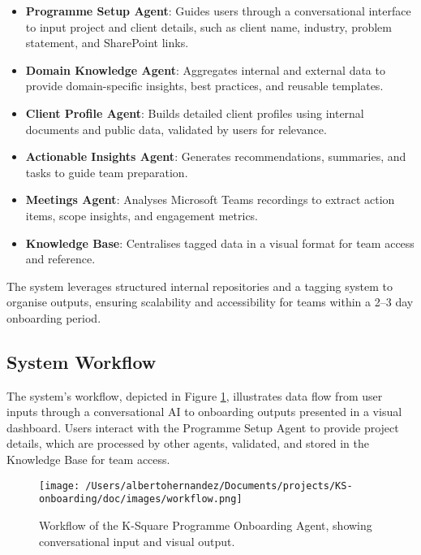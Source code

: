 \documentclass{article}
\begin{document}
\begin{itemize}
    \item \textbf{Programme Setup Agent}: Guides users through a conversational interface to input project and client details, such as client name, industry, problem statement, and SharePoint links.
    \item \textbf{Domain Knowledge Agent}: Aggregates internal and external data to provide domain-specific insights, best practices, and reusable templates.
    \item \textbf{Client Profile Agent}: Builds detailed client profiles using internal documents and public data, validated by users for relevance.
    \item \textbf{Actionable Insights Agent}: Generates recommendations, summaries, and tasks to guide team preparation.
    \item \textbf{Meetings Agent}: Analyses Microsoft Teams recordings to extract action items, scope insights, and engagement metrics.
    \item \textbf{Knowledge Base}: Centralises tagged data in a visual format for team access and reference.
\end{itemize}

The system leverages structured internal repositories and a tagging system to organise outputs, ensuring scalability and accessibility for teams within a 2–3 day onboarding period.

\subsection{System Workflow}
The system’s workflow, depicted in Figure \ref{fig:workflow}, illustrates data flow from user inputs through a conversational AI to onboarding outputs presented in a visual dashboard. Users interact with the Programme Setup Agent to provide project details, which are processed by other agents, validated, and stored in the Knowledge Base for team access.

\begin{landscape}
\begin{figure}[p]
    \centering
    \texttt{[image: /Users/albertohernandez/Documents/projects/KS-onboarding/doc/images/workflow.png]}
    \caption{Workflow of the K-Square Programme Onboarding Agent, showing conversational input and visual output.}
    \label{fig:workflow}
\end{figure}
\end{landscape}
\end{document}

